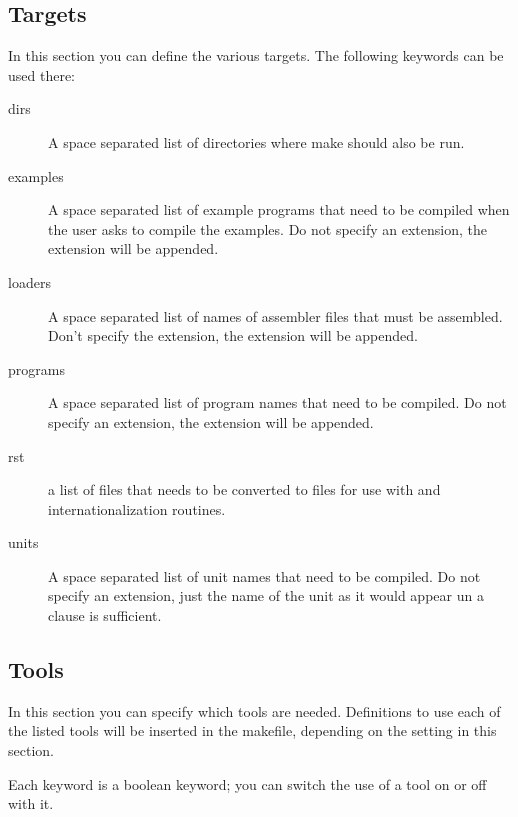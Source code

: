 \subsection{Targets}
In this section you can define the various targets. The following keywords
can be used there:
\begin{description}
\item[dirs]
A space separated list of directories where make should also be run.
\item[examples]
A space separated list of example programs that need to be compiled when
the user asks to compile the examples. Do not specify an extension,
the extension will be appended.
\item[loaders]
A space separated list of names of assembler files that must be assembled.
Don't specify the extension, the extension will be appended.
\item[programs]
A space separated list of program names that need to be compiled. Do not
specify an extension, the extension will be appended.
\item[rst] a list of  files that needs to be converted to 
files for use with \gnu {} and internationalization routines.
\item[units]
A space separated list of unit names that need to be compiled. Do not
specify an extension, just the name of the unit as it would appear un a
 clause is sufficient.
\end{description}

\subsection{Tools}
In this section you can specify which tools are needed. Definitions to
use each of the listed tools will be inserted in the makefile, depending
on the setting in this section.

Each keyword is a boolean keyword; you can switch the use of a tool on or
off with it.

